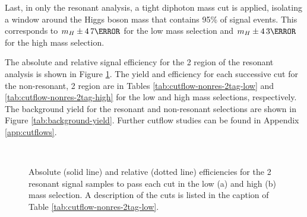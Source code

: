 Last, in only the resonant analysis, a tight diphoton mass cut is applied, isolating a window around the Higgs boson mass that contains 95\% of signal events. This corresponds to $m_H \pm \unit{4.7}{\GeV}$ for the low mass selection and $m_H \pm \unit{4.3}{\GeV}$ for the high mass selection.

The absolute and relative signal efficiency for the 2 \btag region of the resonant analysis is shown in Figure \ref{fig:resonant-cutflow}. The yield and efficiency for each successive cut for the non-resonant, 2 \btag region are in Tables \ref{tab:cutflow-nonres-2tag-low} and \ref{tab:cutflow-nonres-2tag-high} for the low and high mass selections, respectively. The background yield for the resonant and non-resonant selections are shown in Figure \ref{tab:background-yield}. Further cutflow studies can be found in Appendix \ref{app:cutflows}.

\begin{figure}[!htb]
  \centering
  \\
  \caption[Absolute and relative efficiencies for the 2 \btag category, high mass selection]{Absolute (solid line) and relative (dotted line) efficiencies for the 2 \btag resonant signal samples to pass each cut in the low (a) and high (b) mass selection. A description of the cuts is listed in the caption of Table \ref{tab:cutflow-nonres-2tag-low}.}
  \label{fig:resonant-cutflow}
\end{figure}

